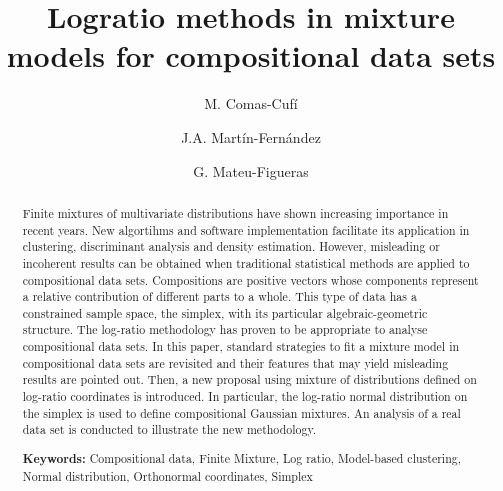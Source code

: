 \documentclass[10pt, a4paper]{article}
\title{Logratio methods in mixture models for compositional data sets}
\author{M. Comas-Cufí \and J.A. Martín-Fernández \and G. Mateu-Figueras}
\begin{document}
\maketitle




\begin{abstract}
Finite mixtures of multivariate distributions have shown increasing importance in recent years. New algortihms and software implementation facilitate its application in clustering, discriminant analysis and density estimation. 
However, misleading or incoherent results can be obtained when traditional statistical methods are applied to compositional data sets.
Compositions are positive vectors whose components represent a relative contribution of different parts to a whole.  This type of data has a
constrained sample space, the simplex, with its particular algebraic-geometric structure. The log-ratio methodology has proven to be appropriate to analyse compositional data sets. In this paper, standard strategies to fit a mixture model in compositional data sets are revisited and their features that may yield misleading results are pointed out. Then, a new proposal using mixture of distributions defined on log-ratio coordinates is introduced. In particular, the log-ratio normal distribution on the simplex is used to define compositional Gaussian mixtures.  An analysis of a real data set is conducted to illustrate the new methodology.

{\bf Keywords:} Compositional data, Finite Mixture, Log ratio, Model-based clustering, Normal distribution, Orthonormal coordinates, Simplex
\end{abstract}



\end{document}
